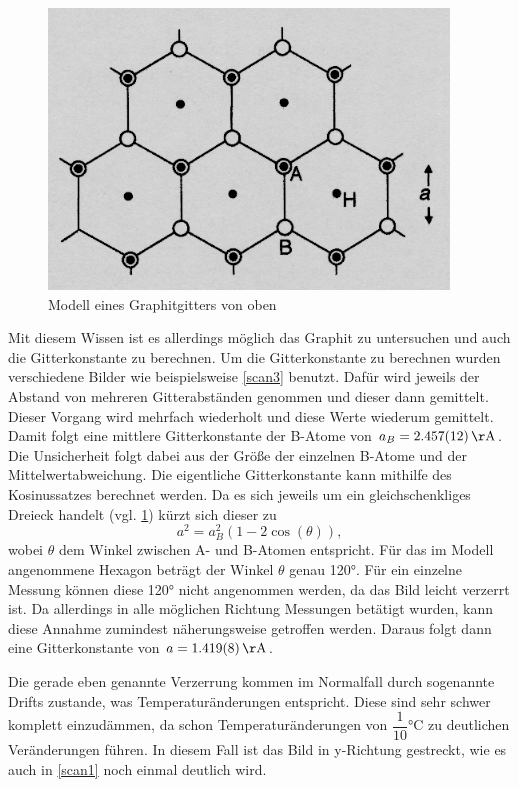 \documentclass[
	a4paper,
	12pt,
	pagesize,
	ngerman
]{scrartcl}
\begin{document}
\begin{figure}[h!]
	\centering
	\includegraphics[scale=0.7]{graphitgitter2.png}
	\caption{Modell eines Graphitgitters von oben}
	\label{gra2}
\end{figure}

Mit diesem Wissen ist es allerdings möglich das Graphit zu untersuchen und auch die Gitterkonstante zu berechnen. Um die Gitterkonstante zu berechnen wurden verschiedene Bilder wie beispielsweise \cref{scan3} benutzt. Dafür wird jeweils der Abstand von mehreren Gitterabständen genommen und dieser dann gemittelt. Dieser Vorgang wird mehrfach wiederholt und diese Werte wiederum gemittelt. Damit folgt eine mittlere Gitterkonstante der B-Atome von $a_{B} = \SI{2,457 \pm 0,012}{\AA}$. Die Unsicherheit folgt dabei aus der Größe der einzelnen B-Atome und der Mittelwertabweichung. Die eigentliche Gitterkonstante kann mithilfe des Kosinussatzes berechnet werden. Da es sich jeweils um ein gleichschenkliges Dreieck handelt (vgl. \cref{gra2}) kürzt sich dieser zu
\begin{equation}
a^{2} = a_{B}^2(1 - 2 \cos(\theta)),
\end{equation}
wobei $\theta$ dem Winkel zwischen A- und B-Atomen entspricht. Für das im Modell angenommene Hexagon beträgt der Winkel $\theta$ genau 120°. Für ein einzelne Messung können diese 120° nicht angenommen werden, da das Bild leicht verzerrt ist. Da allerdings in alle möglichen Richtung Messungen betätigt wurden, kann diese Annahme zumindest näherungsweise getroffen werden. Daraus folgt dann eine Gitterkonstante von $a = \SI{1,419 \pm 0,008} {\AA}$.

Die gerade eben genannte Verzerrung kommen im Normalfall durch sogenannte Drifts zustande, was Temperaturänderungen entspricht. Diese sind sehr schwer komplett einzudämmen, da schon Temperaturänderungen von $\dfrac{1}{10}$°C zu deutlichen Veränderungen führen. In diesem Fall ist das Bild in y-Richtung gestreckt, wie es auch in \cref{scan1} noch einmal deutlich wird.  
\end{document}

